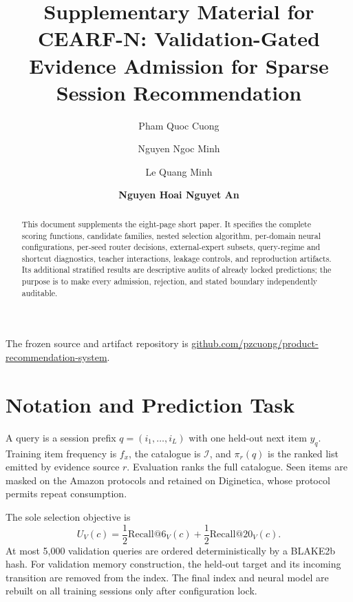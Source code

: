\documentclass[runningheads]{llncs}
\newcommand{\method}{CEARF-N}
\begin{document}
\title{Supplementary Material for \method{}: Validation-Gated Evidence
Admission for Sparse Session Recommendation}
\titlerunning{Supplementary Material for \method{}}
\author{Pham Quoc Cuong \and
Nguyen Ngoc Minh \and
Le Quang Minh \and
\textbf{Nguyen Hoai Nguyet An}}
\maketitle

\begin{abstract}
This document supplements the eight-page short paper. It specifies the
complete scoring functions, candidate families, nested selection algorithm,
per-domain neural configurations, per-seed router decisions, external-expert
subsets, query-regime and shortcut diagnostics, teacher interactions, leakage
controls, and reproduction artifacts. Its additional stratified results are
descriptive audits of already locked predictions; the purpose is to make every
admission, rejection, and stated boundary independently auditable.
\end{abstract}
The frozen source and artifact repository is
\href{https://github.com/pzcuong/product-recommendation-system}
{github.com/pzcuong/product-recommendation-system}.

\section{Notation and Prediction Task}
A query is a session prefix $q=(i_1,\ldots,i_L)$ with one held-out next item
$y_q$. Training item frequency is $f_x$, the catalogue is $\mathcal I$, and
$\pi_r(q)$ is the ranked list emitted by evidence source $r$. Evaluation ranks
the full catalogue. Seen items are masked on the Amazon protocols and retained
on Diginetica, whose protocol permits repeat consumption.

The sole selection objective is
\[
U_V(c)=\frac12\mathrm{Recall@6}_V(c)
      +\frac12\mathrm{Recall@20}_V(c).
\]
At most 5,000 validation queries are ordered deterministically by a BLAKE2b
hash. For validation memory construction, the held-out target and its incoming
transition are removed from the index. The final index and neural model are
rebuilt on all training sessions only after configuration lock.
\end{document}
